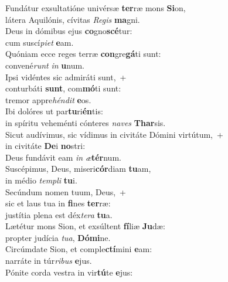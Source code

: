 \evenverse Fundátur exsultatióne univérsæ \textbf{ter}ræ mons \textbf{Si}on,~\*\\
\evenverse látera Aquilónis, cívitas \textit{Re}\textit{gis} \textbf{ma}gni.\\
\oddverse Deus in dómibus ejus \textbf{co}gno\textbf{scé}tur:~\*\\
\oddverse cum suscí\textit{pi}\textit{et} \textbf{e}am.\\
\evenverse Quóniam ecce reges terræ \textbf{con}gre\textbf{gá}ti sunt:~\*\\
\evenverse convené\textit{runt} \textit{in} \textbf{u}num.\\
\oddverse Ipsi vidéntes sic admiráti sunt,~+\\
\oddverse  conturbáti \textbf{sunt}, com\textbf{mó}ti sunt:~\*\\
\oddverse tremor appre\textit{hén}\textit{dit} \textbf{e}os.\\
\evenverse Ibi dolóres ut par\textbf{tu}ri\textbf{én}tis:~\*\\
\evenverse in spíritu veheménti cónteres \textit{na}\textit{ves} \textbf{Thar}sis.\\
\oddverse Sicut audívimus, sic vídimus in civitáte Dómini virtútum,~+\\
\oddverse  in civitáte \textbf{De}i \textbf{no}stri:~\*\\
\oddverse Deus fundávit eam \textit{in} \textit{æ}\textbf{tér}num.\\
\evenverse Suscépimus, Deus, miseri\textbf{cór}diam \textbf{tu}am,~\*\\
\evenverse in médio \textit{tem}\textit{pli} \textbf{tu}i.\\
\oddverse Secúndum nomen tuum, Deus,~+\\
\oddverse  sic et laus tua in \textbf{fi}nes \textbf{ter}ræ:~\*\\
\oddverse justítia plena est déx\textit{te}\textit{ra} \textbf{tu}a.\\
\evenverse Lætétur mons Sion, et exsúltent \textbf{fí}liæ \textbf{Ju}dæ:~\*\\
\evenverse propter judícia \textit{tu}\textit{a}, \textbf{Dó}\textbf{mi}ne.\\
\oddverse Circúmdate Sion, et comple\textbf{ctí}mini \textbf{e}am:~\*\\
\oddverse narráte in túr\textit{ri}\textit{bus} \textbf{e}jus.\\
\evenverse Pónite corda vestra in vir\textbf{tú}te \textbf{e}jus:~\*\\

